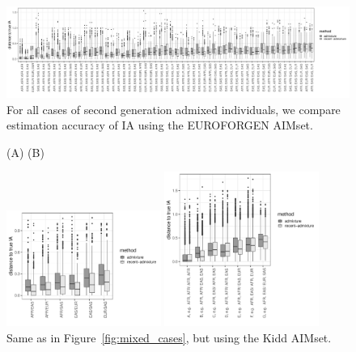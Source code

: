 \documentclass[12pt]{article}
\theoremstyle{definition}
\begin{document}
\begin{figure}
  \centering
  \includegraphics[width=\textwidth]{deviations_mixed_allcases.pdf}
  \caption{For all cases of second generation admixed individuals, we
    compare estimation accuracy of IA using the EUROFORGEN AIMset.}
  \label{fig:mixed_allcases}
\end{figure}

\begin{figure}[htb]
  \hspace{3cm} (A) \hspace{8cm} (B)
  \begin{center}
    \parbox[b]{0.45\textwidth}{\includegraphics[width=0.45\textwidth]{deviations_mixed_Kidd.pdf}\vspace{2cm}}
    \hspace{1cm}
    \parbox[b]{0.45\textwidth}{\includegraphics[width=0.45\textwidth]{deviations_mixed_cases_Kidd.pdf}}
  \end{center}
  \caption{\label{fig:mixed_cases_Kidd} Same as in
    Figure~\ref{fig:mixed_cases}, but using the Kidd AIMset.}
\end{figure}
\end{document}

